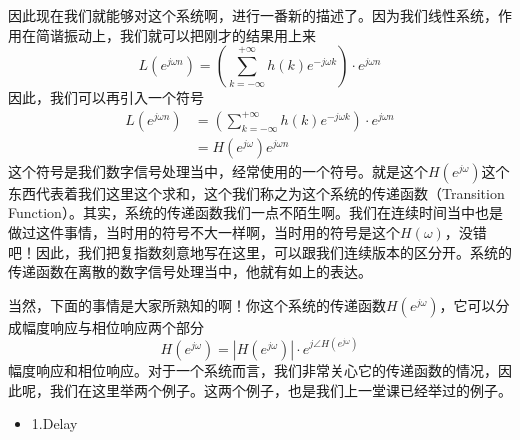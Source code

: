 \documentclass[a4paper,12pt]{article}
\begin{document}
因此现在我们就能够对这个系统啊，进行一番新的描述了。因为我们线性系统，作用在简谐振动上，我们就可以把刚才的结果用上来
\begin{equation}
   L\left (  e^{j\omega n} \right ) =  \left (  \sum_{k=-\infty}^{+\infty}h(k)e^{-j\omega k} \right )\cdot e^{j\omega n}
\end{equation}
因此，我们可以再引入一个符号
\begin{equation}
\begin{aligned}
   L\left (  e^{j\omega n} \right ) &=  \left (  \sum_{k=-\infty}^{+\infty}h(k)e^{-j\omega k} \right )\cdot e^{j\omega n}\\
&=  H\left (  e^{j\omega} \right ) e^{j\omega n}
\end{aligned}
\end{equation}
这个符号是我们数字信号处理当中，经常使用的一个符号。就是这个$H\left (  e^{j\omega} \right )$这个东西代表着我们这里这个求和，这个我们称之为这个系统的传递函数（Transition Function）。其实，系统的传递函数我们一点不陌生啊。我们在连续时间当中也是做过这件事情，当时用的符号不大一样啊，当时用的符号是这个$H(\omega)$，没错吧！因此，我们把复指数刻意地写在这里，可以跟我们连续版本的区分开。系统的传递函数在离散的数字信号处理当中，他就有如上的表达。

当然，下面的事情是大家所熟知的啊！你这个系统的传递函数$H\left (  e^{j\omega} \right )$，它可以分成幅度响应与相位响应两个部分
\begin{equation}
   H\left (  e^{j\omega} \right ) = \left | H\left (  e^{j\omega} \right ) \right | \cdot e^{j\angle  H\left (  e^{j\omega} \right )}
\end{equation}
幅度响应和相位响应。对于一个系统而言，我们非常关心它的传递函数的情况，因此呢，我们在这里举两个例子。这两个例子，也是我们上一堂课已经举过的例子。
\begin{itemize}
    \item 1.\quad Delay
\end{itemize}
\end{document}
